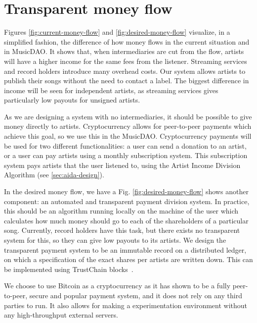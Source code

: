 \section{Transparent money flow}
Figures \ref{fig:current-money-flow} and \ref{fig:desired-money-flow} visualize, in a simplified fashion, the difference of how money flows in the current situation and in MusicDAO. It shows that, when intermediaries are cut from the flow, artists will have a higher income for the same fees from the listener. Streaming services and record holders introduce many overhead costs. Our system allows artists to publish their songs without the need to contact a label. The biggest difference in income will be seen for independent artists, as streaming services gives particularly low payouts for unsigned artists.

As we are designing a system with no intermediaries, it should be possible to give money directly to artists. Cryptocurrency allows for peer-to-peer payments which achieve this goal, so we use this in the MusicDAO. Cryptocurrency payments will be used for two different functionalities: a user can send a donation to an artist, or a user can pay artists using a monthly subscription system. This subscription system pays artists that the user listened to, using the Artist Income Division Algorithm (see \ref{sec:aida-design}). 

In the desired money flow, we have a  Fig. \ref{fig:desired-money-flow} shows another component: an automated and transparent payment division system. In practice, this should be an algorithm running locally on the machine of the user which calculates how much money should go to each of the shareholders of a particular song. Currently, record holders have this task, but there exists no transparent system for this, so they can give low payouts to its artists. We design the transparent payment system to be an immutable record on a distributed ledger, on which a specification of the exact shares per artists are written down. This can be implemented using TrustChain blocks~\citep{otte2017trustchain}.

We choose to use Bitcoin as a cryptocurrency as it has shown to be a fully peer-to-peer, secure and popular payment system, and it does not rely on any third parties to run. It also allows for making a experimentation environment without any high-throughput external servers. 

